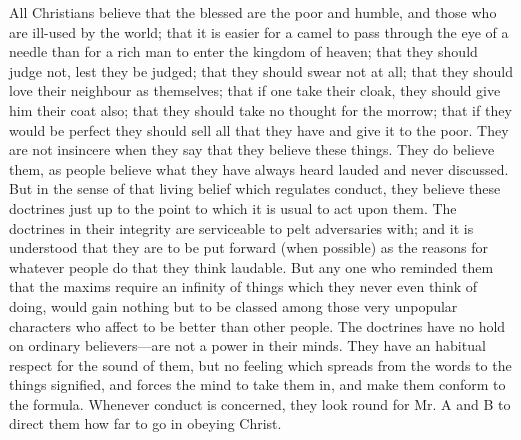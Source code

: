 \documentclass[11pt,openany]{book}
\begin{document}
All Christians believe that the blessed are the poor and humble, and those who are ill-used by the world; that it is easier for a camel to pass through the eye of a needle than for a rich man to enter the kingdom of heaven; that they should judge not, lest they be judged; that they should swear not at all; that they should love their neighbour as themselves; that if one take their cloak, they should give him their coat also; that they should take no thought for the morrow; that if they would be perfect they should sell all that they have and give it to the poor. They are not insincere when they say that they believe these things. They do believe them, as people believe what they have always heard lauded and never discussed. But in the sense of that living belief which regulates conduct, they believe these doctrines just up to the point to which it is usual to act upon them. The doctrines in their integrity are serviceable to pelt adversaries with; and it is understood that they are to be put forward (when possible) as the reasons for whatever people do that they think laudable. But any one who reminded them that the maxims require an infinity of things which they never even think of doing, would gain nothing but to be classed among those very unpopular characters who affect to be better than other people. The doctrines have no hold on ordinary believers---are not a power in their minds. They have an habitual respect for the sound of them, but no feeling which spreads from the words to the things signified, and forces the mind to take them in, and make them conform to the formula. Whenever conduct is concerned, they look round for Mr. A and B to direct them how far to go in obeying Christ.
\end{document}
